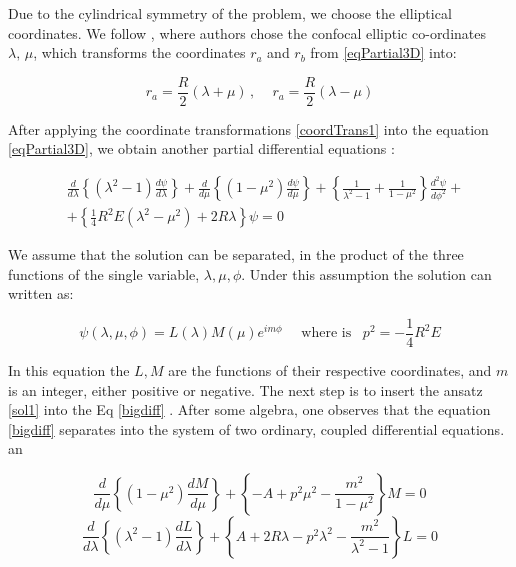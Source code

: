 Due to the cylindrical symmetry of the problem, we choose the elliptical coordinates. We follow \cite{Bates1}, where authors chose the confocal elliptic co-ordinates $\lambda,\,\mu $, which transforms the coordinates $ r_a $ and $ r_ b $ from \eqref {eqPartial3D} into:

\begin{equation}\label{coordTrans1}
r_a = \frac{R}{2}(\lambda + \mu)\,,\,\,\,\,\,\,\,r_a = \frac{R}{2}(\lambda - \mu)
\end{equation}

After applying the coordinate transformations \eqref{coordTrans1} into the equation \eqref {eqPartial3D}, we obtain another partial differential equations \cite{Bates1}:

\begin{equation}\label{bigdiff}
\begin{split}
    & \frac{d}{d\lambda}\left\{(\lambda^2-1)\frac{d\psi}{d\lambda}\right\} +\frac{d}{d\mu}\left\{(1-\mu^2)\frac{d\psi}{d\mu}\right\} + \left\{\frac{1}{\lambda^2-1} + \frac{1}{1-\mu^2} \right\}\frac{d^2\psi}{d\phi^2}+ \\[0.5em]
    & + \left\{\frac{1}{4}R^2E(\lambda^2 - \mu^2) + 2R\lambda \right\}\psi = 0
\end{split}
\end{equation}

We assume that the solution can be separated, in the product of the three functions of the single variable, $\lambda,\mu, \phi $. Under this assumption the solution can written as:

\begin{equation}\label{sol1}
\psi(\lambda, \mu, \phi) = L(\lambda)M(\mu)e^{im\phi}\,\,\,\,\,\,\text{ where is }\,\,\,p^2 = -\frac{1}{4}R^2E
\end{equation}

In this equation the $ L, M $ are the functions of their respective coordinates, and $ m $ is an integer, either positive or negative. The next step is to insert the ansatz \eqref{sol1} into the Eq \eqref{bigdiff} .  After some algebra, one observes that the equation \eqref{bigdiff} separates into the system of two ordinary, coupled differential equations.
an

\begin{equation}\label{m3d}
\frac{d}{d\mu}\left\{(1-\mu^2)\frac{dM}{d\mu}\right\} + \left\{-A + p^2\mu^2 -\frac{m^2}{1-\mu^2} \right\}M = 0 
\end{equation}
\begin{equation}\label{l3d}
\frac{d}{d\lambda}\left\{(\lambda^2-1)\frac{dL}{d\lambda}\right\} + \left\{A + 2R\lambda - p^2\lambda^2 -\frac{m^2}{\lambda^2-1} \right\}L = 0 
\end{equation}

